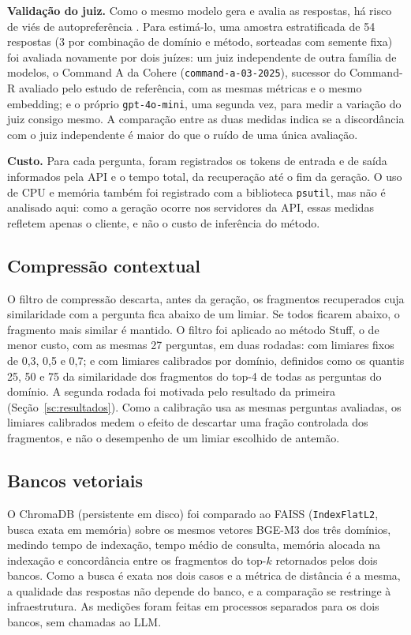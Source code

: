 \textbf{Validação do juiz.} Como o mesmo modelo gera e avalia as respostas, há risco de viés de autopreferência \cite{panickssery2024selfpref}. Para estimá-lo, uma amostra estratificada de 54 respostas (3 por combinação de domínio e método, sorteadas com semente fixa) foi avaliada novamente por dois juízes: um juiz independente de outra família de modelos, o Command A da Cohere (\texttt{command-a-03-2025}), sucessor do Command-R avaliado pelo estudo de referência, com as mesmas métricas e o mesmo embedding; e o próprio \texttt{gpt-4o-mini}, uma segunda vez, para medir a variação do juiz consigo mesmo. A comparação entre as duas medidas indica se a discordância com o juiz independente é maior do que o ruído de uma única avaliação.

\textbf{Custo.} Para cada pergunta, foram registrados os tokens de entrada e de saída informados pela API e o tempo total, da recuperação até o fim da geração. O uso de CPU e memória também foi registrado com a biblioteca \texttt{psutil}, mas não é analisado aqui: como a geração ocorre nos servidores da API, essas medidas refletem apenas o cliente, e não o custo de inferência do método.

\subsection{Compressão contextual}

O filtro de compressão descarta, antes da geração, os fragmentos recuperados cuja similaridade com a pergunta fica abaixo de um limiar. Se todos ficarem abaixo, o fragmento mais similar é mantido. O filtro foi aplicado ao método Stuff, o de menor custo, com as mesmas 27 perguntas, em duas rodadas: com limiares fixos de 0,3, 0,5 e 0,7; e com limiares calibrados por domínio, definidos como os quantis 25, 50 e 75 da similaridade dos fragmentos do top-4 de todas as perguntas do domínio. A segunda rodada foi motivada pelo resultado da primeira (Seção~\ref{sc:resultados}). Como a calibração usa as mesmas perguntas avaliadas, os limiares calibrados medem o efeito de descartar uma fração controlada dos fragmentos, e não o desempenho de um limiar escolhido de antemão.

\subsection{Bancos vetoriais}

O ChromaDB (persistente em disco) foi comparado ao FAISS \cite{johnson2021faiss} (\texttt{IndexFlatL2}, busca exata em memória) sobre os mesmos vetores BGE-M3 dos três domínios, medindo tempo de indexação, tempo médio de consulta, memória alocada na indexação e concordância entre os fragmentos do top-$k$ retornados pelos dois bancos. Como a busca é exata nos dois casos e a métrica de distância é a mesma, a qualidade das respostas não depende do banco, e a comparação se restringe à infraestrutura. As medições foram feitas em processos separados para os dois bancos, sem chamadas ao LLM.

